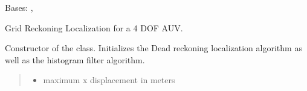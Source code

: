 \documentclass[letterpaper,10pt,english]{sphinxmanual}
\begin{document}
\begin{fulllineitems}
\label{\detokenize{GridLocalization:GL_4DOFAUV.GL_4DOFAUV}}
\pysigstartsignatures
{}
\pysigstopsignatures
\sphinxAtStartPar
Bases: {\hyperref[\detokenize{GridLocalization:GL.GL}]{}}, {\hyperref[\detokenize{DRLocalization:DR_4DOFAUV_DVLGyro.DR_4DOFAUV_DVLGyro}]{}}

\sphinxAtStartPar
Grid Reckoning Localization for a 4 DOF AUV.

\begin{fulllineitems}
\label{\detokenize{GridLocalization:GL_4DOFAUV.GL_4DOFAUV.__init__}}
\pysigstartsignatures
{}
\pysigstopsignatures
\sphinxAtStartPar
Constructor of the {\hyperref[\detokenize{GridLocalization:GL_4DOFAUV.GL_4DOFAUV}]{}} class. Initializes the Dead reckoning localization algorithm as well as the histogram filter algorithm.
\begin{quote}\begin{description}
\begin{itemize}
\item {} 
\sphinxAtStartPar
{} \textendash{} maximum x displacement in meters


\end{itemize}
\end{description}
\end{quote}
\end{fulllineitems}
\end{fulllineitems}
\end{document}
